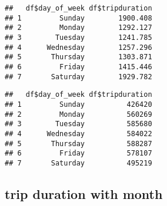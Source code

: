 \documentclass[
]{article}
\newenvironment{Shaded}{\begin{snugshade}}{\end{snugshade}}
\newcommand{\AttributeTok}[1]{\textcolor[rgb]{0.77,0.63,0.00}{#1}}
\newcommand{\FunctionTok}[1]{\textcolor[rgb]{0.00,0.00,0.00}{#1}}
\newcommand{\NormalTok}[1]{#1}
\newcommand{\OtherTok}[1]{\textcolor[rgb]{0.56,0.35,0.01}{#1}}
\newcommand{\SpecialCharTok}[1]{\textcolor[rgb]{0.00,0.00,0.00}{#1}}
\newcommand{\StringTok}[1]{\textcolor[rgb]{0.31,0.60,0.02}{#1}}
\begin{document}
\begin{verbatim}
##   df$day_of_week df$tripduration
## 1         Sunday        1900.408
## 2         Monday        1292.127
## 3        Tuesday        1241.785
## 4      Wednesday        1257.296
## 5       Thursday        1303.871
## 6         Friday        1415.446
## 7       Saturday        1929.782
\end{verbatim}

\begin{Shaded}
\end{Shaded}

\begin{verbatim}
##   df$day_of_week df$tripduration
## 1         Sunday          426420
## 2         Monday          560269
## 3        Tuesday          585680
## 4      Wednesday          584022
## 5       Thursday          588287
## 6         Friday          578107
## 7       Saturday          495219
\end{verbatim}

\hypertarget{trip-duration-with-month}{%
\subsection{trip duration with month}\label{trip-duration-with-month}}

\begin{Shaded}
\end{Shaded}
\end{document}

